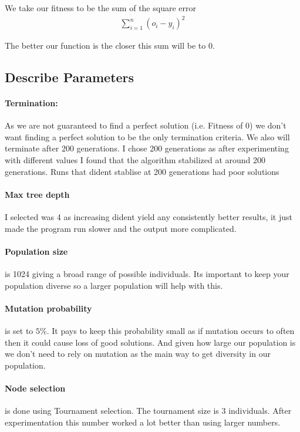 \documentclass[a4paper, 12pt]{article}
\begin{document}
			We take our fitness to be the sum of the square error
			\begin{align*}
				\sum_{i=1}^{n} (o_i - y_i)^2
			\end{align*}
			
			The better our function is the closer this sum will be to 0.
		
		\subsection{Describe Parameters}
		
			\paragraph{Termination:} As we are not guaranteed to find a perfect solution (i.e. Fitness of 0) we don't want finding a perfect solution to be the only termination criteria. We also will terminate after 200 generations. I chose 200 generations as after experimenting with different values I found that the algorithm stabilized at around 200 generations. Runs that dident stablise at 200 generations had poor solutions
			
			\paragraph{Max tree depth} I selected was 4 as increasing dident yield any consistently better results, it just made the program run slower and the output more complicated.
		
			\paragraph{Population size} is 1024 giving a broad range of possible individuals. Its important to keep your population diverse so a larger population will help with this.
			
			\paragraph{Mutation probability} is set to $5\%$. It pays to keep this probability small as if mutation occurs to often then it could cause loss of good solutions. And given how large our population is we don't need to rely on mutation as the main way to get diversity in our population.

			\paragraph{Node selection} is done using Tournament selection. The tournament size is 3 individuals. After experimentation this number worked a lot better than using larger numbers.
			
\end{document}
